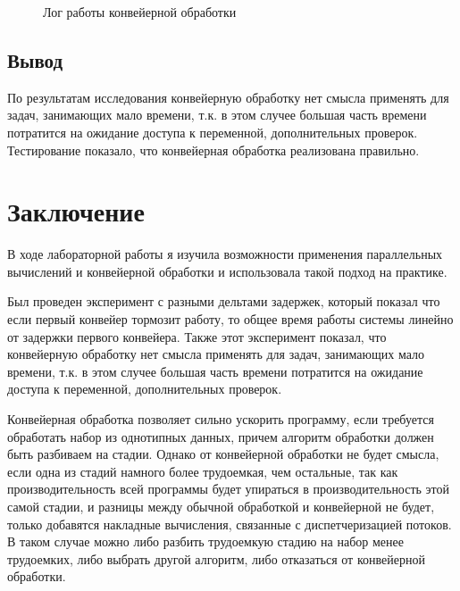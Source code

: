 \documentclass[12pt]{report}
\begin{document}
\begin{figure}[h]
	\caption{Лог работы конвейерной обработки}
	\label{fig:v_st}
\end{figure}



\section{Вывод}
По результатам исследования конвейерную обработку нет смысла применять для задач, занимающих мало времени, т.к. в этом случее большая часть времени
потратится на ожидание доступа к переменной, дополнительных проверок.
Тестирование показало, что конвейерная обработка реализована правильно.

\chapter*{Заключение}
В ходе лабораторной работы я изучила возможности применения параллельных вычислений и конвейерной обработки и использовала такой подход на практике. 

Был проведен эксперимент с разными дельтами задержек, который показал что если первый конвейер тормозит работу, то общее время работы системы
линейно от задержки первого конвейера. Также этот эксперимент показал, что конвейерную обработку нет смысла применять для задач, занимающих мало времени, т.к. в этом случее большая часть времени потратится на ожидание доступа к переменной, дополнительных проверок.

Конвейерная обработка позволяет сильно ускорить программу, если требуется обработать набор из однотипных данных, причем алгоритм обработки должен быть разбиваем на стадии. Однако от конвейерной обработки не будет смысла, если одна из стадий намного более трудоемкая, чем остальные, так как производительность всей программы будет упираться в производительность этой самой стадии, и разницы между обычной обработкой и конвейерной не будет, только добавятся накладные вычисления, связанные с диспетчеризацией потоков. В таком случае можно либо разбить трудоемкую стадию на набор менее трудоемких, либо выбрать другой алгоритм, либо отказаться от конвейерной обработки.
\end{document}

